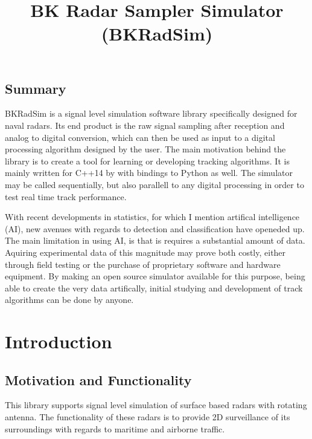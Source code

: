 \documentclass[letterpaper]{book}
\begin{document}
\title{ BK Radar Sampler Simulator (BKRadSim) }
\maketitle

\section{Summary}




BKRadSim is a signal level simulation software library specifically designed for naval radars. Its end product is the raw signal sampling after reception and analog to digital conversion, which can then be used as input to a digital processing algorithm designed by the user. The main motivation behind the library is to create a tool for learning or developing tracking algorithms. It is mainly written for C++14 by with bindings to Python as well. The simulator may be called sequentially, but also parallell to any digital processing in order to test real time track performance. 

With recent developments in statistics, for which I mention artifical intelligence (AI), new avenues with regards to detection and classification have openeded up. The main limitation in using AI, is that is requires a substantial amount of data. Aquiring experimental data of this magnitude may prove both costly, either through field testing or the purchase of proprietary software and hardware equipment. By making an open source simulator available for this purpose, being able to create the very data artifically, initial studying and development of track algorithms can be done by anyone. 





\tableofcontents

\chapter{Introduction}
\section{Motivation and Functionality}
This library supports signal level simulation of surface based radars with rotating antenna. The functionality of these radars is to provide 2D surveillance of its surroundings with regards to maritime and airborne traffic. 
\end{document}
